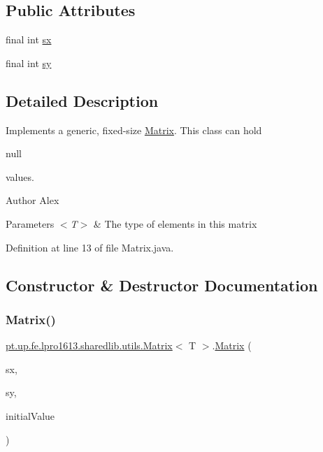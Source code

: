 \subsection*{Public Attributes}
\begin{DoxyCompactItemize}
\item 
final int \hyperlink{classpt_1_1up_1_1fe_1_1lpro1613_1_1sharedlib_1_1utils_1_1_matrix_ad08b31400c1f61080086b12e56e4f31d}{sx}
\item 
final int \hyperlink{classpt_1_1up_1_1fe_1_1lpro1613_1_1sharedlib_1_1utils_1_1_matrix_ae47549088ae73a43f9b7da81608debbd}{sy}
\end{DoxyCompactItemize}


\subsection{Detailed Description}
Implements a generic, fixed-\/size \hyperlink{classpt_1_1up_1_1fe_1_1lpro1613_1_1sharedlib_1_1utils_1_1_matrix}{Matrix}. This class can hold
\begin{DoxyCode}
null 
\end{DoxyCode}
 values.

\begin{DoxyAuthor}{Author}
Alex 
\end{DoxyAuthor}

\begin{DoxyParams}{Parameters}
{\em $<$\+T$>$} & The type of elements in this matrix \\
\hline
\end{DoxyParams}


Definition at line 13 of file Matrix.\+java.



\subsection{Constructor \& Destructor Documentation}
\hypertarget{classpt_1_1up_1_1fe_1_1lpro1613_1_1sharedlib_1_1utils_1_1_matrix_a1522ee2995d4f1f59f973f2c6143e658}{}\label{classpt_1_1up_1_1fe_1_1lpro1613_1_1sharedlib_1_1utils_1_1_matrix_a1522ee2995d4f1f59f973f2c6143e658} 
\subsubsection{\texorpdfstring{Matrix()}{Matrix()}}
{\footnotesize\ttfamily \hyperlink{classpt_1_1up_1_1fe_1_1lpro1613_1_1sharedlib_1_1utils_1_1_matrix}{pt.\+up.\+fe.\+lpro1613.\+sharedlib.\+utils.\+Matrix}$<$ T $>$.\hyperlink{classpt_1_1up_1_1fe_1_1lpro1613_1_1sharedlib_1_1utils_1_1_matrix}{Matrix} (\begin{DoxyParamCaption}\item[{int}]{sx,  }\item[{int}]{sy,  }\item[{T}]{initial\+Value }\end{DoxyParamCaption})}

